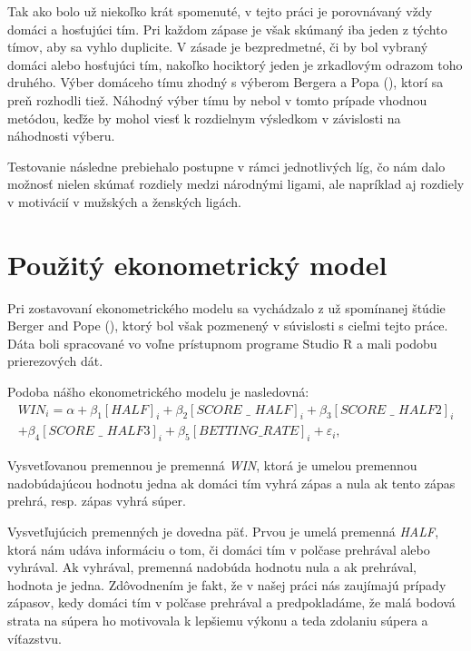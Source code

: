 \documentclass[
  digital, %
  twoside, %
  notable,   %
  lof,     %
  lot,     %
]{fithesis3}
\begin{document}
		Tak ako bolo už niekoľko krát spomenuté, v tejto práci je porovnávaný vždy domáci a hosťujúci tím. Pri každom zápase je však skúmaný iba jeden z týchto tímov, aby sa vyhlo duplicite. V zásade je bezpredmetné, či by bol vybraný domáci alebo hosťujúci tím, nakoľko hociktorý jeden je zrkadlovým odrazom toho druhého. Výber domáceho tímu zhodný s výberom Bergera a Popa (\citeyear{berger2011}), ktorí sa preň rozhodli tiež. Náhodný výber tímu by nebol v tomto prípade vhodnou metódou, keďže by mohol viesť k rozdielnym výsledkom v závislosti na náhodnosti výberu.
		
		Testovanie následne prebiehalo postupne v rámci jednotlivých líg, čo nám dalo možnosť nielen skúmať rozdiely medzi národnými ligami, ale napríklad aj rozdiely v motivácií v mužských a ženských ligách.
		
		\section{Použitý ekonometrický model}
		\label{sec:pouzitymodel}
		Pri zostavovaní ekonometrického modelu sa vychádzalo z už spomínanej štúdie Berger and Pope (\citeyear{berger2011}), ktorý bol však pozmenený v súvislosti s cieľmi tejto práce. Dáta boli spracované vo voľne prístupnom programe Studio R a mali podobu prierezových dát.
		
		Podoba nášho ekonometrického modelu je nasledovná:
		\begin{multline}
		WIN_{i} = \alpha + \beta _{1} [\textit{HALF}]_{i} + \beta _{2} [\textit{SCORE~\_~HALF}]_{i} + \beta _{3} [\textit{SCORE~\_~HALF2}]_{i} \\
		+ \beta _{4} [\textit{SCORE~\_~HALF3}]_{i} + \beta _{5} [\textit{BETTING\_RATE}]_{i} + \varepsilon_{i},
		\end{multline}
		
		Vysvetľovanou premennou je premenná \textit{WIN}, ktorá je umelou premennou nadobúdajúcou hodnotu jedna ak domáci tím vyhrá zápas a nula ak tento zápas prehrá, resp. zápas vyhrá súper. 
		
		Vysvetľujúcich premenných je dovedna päť. Prvou je umelá premenná \textit{HALF}, ktorá nám udáva informáciu o tom, či domáci tím v polčase prehrával alebo vyhrával. Ak vyhrával, premenná nadobúda hodnotu nula a ak prehrával, hodnota je jedna. Zdôvodnením je fakt, že v našej práci nás zaujímajú prípady zápasov, kedy domáci tím v polčase prehrával a predpokladáme, že malá bodová strata na súpera ho motivovala k lepšiemu výkonu a teda zdolaniu súpera a víťazstvu. 
		
\end{document}
